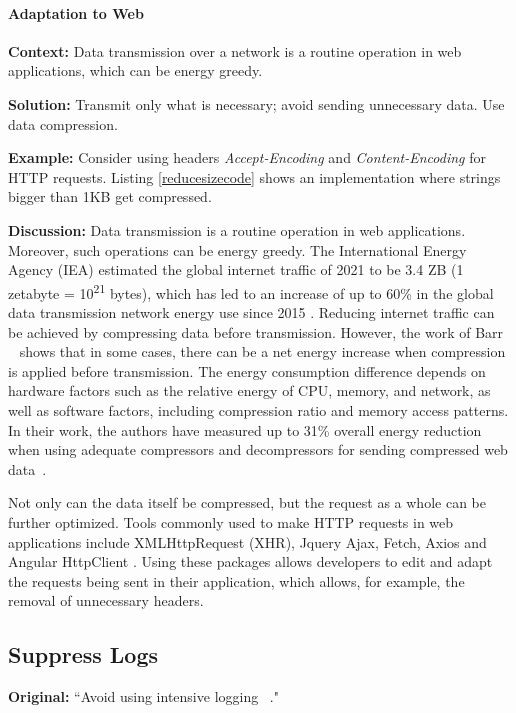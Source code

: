 \paragraph{Adaptation to Web}\mbox{}

\textbf{Context:} Data transmission over a network is a routine operation in web applications, which can be energy greedy.

\textbf{Solution:} Transmit only what is necessary; avoid sending unnecessary data. Use data compression.

\textbf{Example:} Consider using headers \emph{Accept-Encoding} and \emph{Content-Encoding} for HTTP requests. Listing \ref{reducesizecode} shows an implementation where strings bigger than 1KB get compressed.


\textbf{Discussion:} Data transmission is a routine operation in web applications. Moreover, such operations can be energy greedy. The International Energy Agency (IEA) estimated the global internet traffic of 2021 to be 3.4 ZB (1 zetabyte = 10\textsuperscript{21} bytes), which has led to an increase of up to 60\% in the global data transmission network energy use since 2015 \cite{data_transmission_of_data_centers}. Reducing internet traffic can be achieved by compressing data before transmission. However, the work of Barr \etal ~\cite{Barr2006}  shows that in some cases, there can be a net energy increase when compression is applied before transmission. The energy consumption difference depends on hardware factors such as the relative energy of CPU, memory, and network, as well as software factors, including compression ratio and memory access patterns. In their work, the authors have measured up to 31\% overall energy reduction when using adequate compressors and decompressors for sending compressed web data~\cite{Barr2006}.

Not only can the data itself be compressed, but the request as a whole can be further optimized. Tools commonly used to make HTTP requests in web applications include XMLHttpRequest (XHR), Jquery Ajax, Fetch, Axios and Angular HttpClient \cite{Angular_Http_Client}. Using these packages allows developers to edit and adapt the requests being sent in their application, which allows, for example, the removal of unnecessary headers.



\subsection{Suppress Logs} \label{sec:patterns-SuppressLogs}
\textbf{Original:} ``Avoid using intensive logging ~\cite{cruz2019catalog}."

